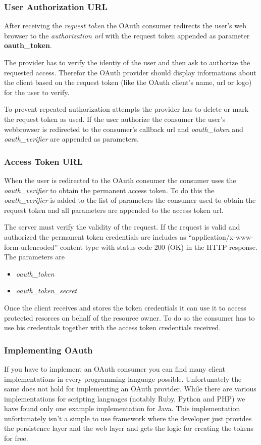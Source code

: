 \subsubsection{User Authorization URL}

After receiving the \emph{request token} the OAuth consumer
redirects the user's web browser to the \emph{authorization url}
with the request token appended as parameter
\textbf{oauth\_token}.

The provider has to verify the identiy of the user and then ask to
authorize the requested access. Therefor the OAuth provider should
display informations about the client based on the request token
(like the OAuth client's name, url or logo) for the user to
verify.

To prevent repeated authorization attempts the provider has to
delete or mark the request token as used. If the user authorize the
consumer the user's webbrowser is redirected to the consumer's
callback url and \emph{oauth\_token} and \emph{oauth\_verifier} are
appended as parameters.

\subsubsection{Access Token URL}

When the user is redirected to the OAuth consumer the consumer uses
the \emph{oauth\_verifier} to obtain the permanent access token. To
do this the \emph{oauth\_verifier} is added to the list of
parameters the consumer used to obtain the request token and all
parameters are appended to the access token url.

The server must verify the validity of the request. If the request
is valid and authorized the permanent token credentials are
includes as ``application/x-www-form-urlencoded'' content type with
status code 200 (OK) in the HTTP response. The parameters are

\begin{itemize}
\item
  \emph{oauth\_token}
\item
  \emph{oauth\_token\_secret}
\end{itemize}
Once the client receives and stores the token credentials it can
use it to access protected resorces on behalf of the resource
owner. To do so the consumer has to use his credentials together
with the access token credentials received.

\subsubsection{Implementing OAuth}

If you have to implement an OAuth consumer you can find many client
implementations in every programming language possible.
Unfortunately the same does not hold for implementing an OAuth
provider. While there are various implementations for scripting
languages (notably Ruby, Python and PHP) we have found only one
example implementation for Java. This implementation unfortunately
isn't a simple to use framework where the developer just provides
the persistence layer and the web layer and gets the logic for
creating the tokens for free.